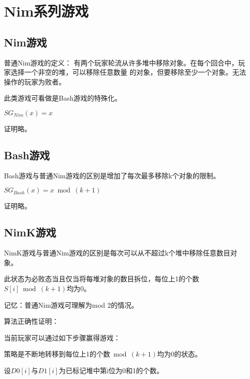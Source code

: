 \section{Nim系列游戏}

\subsection{Nim游戏}


普通Nim游戏的定义：
有两个玩家轮流从许多堆中移除对象。在每个回合中，玩家选择一个非空的堆，可以移除任意数量
的对象，但要移除至少一个对象。无法操作的玩家为败者。

此类游戏可看做是Bash游戏的特殊化。

\begin{theorem}
	$SG_{Nim}(x)=x$
\end{theorem}

证明略。

\subsection{Bash游戏}


Bash游戏与普通Nim游戏的区别是增加了每次最多移除k个对象的限制。

\begin{theorem}
	$SG_{Bash}(x)=x \bmod (k+1)$
\end{theorem}

证明略。

\subsection{NimK游戏}


NimK游戏与普通Nim游戏的区别是每次可以从不超过k个堆中移除任意数目对象。

\begin{theorem}\label{NimK}
	此状态为必败态当且仅当将每堆对象的数目拆位，每位上1的个数$S[i] \bmod (k+1)$均为0。
\end{theorem}

记忆：普通Nim游戏可理解为mod 2的情况。

算法正确性证明：

当前玩家可以通过如下步骤赢得游戏：

策略是不断地转移到每位上1的个数$\bmod (k+1)$均为0的状态。

设$D0[i]$与$D1[i]$为已标记堆中第i位为0和1的个数。

